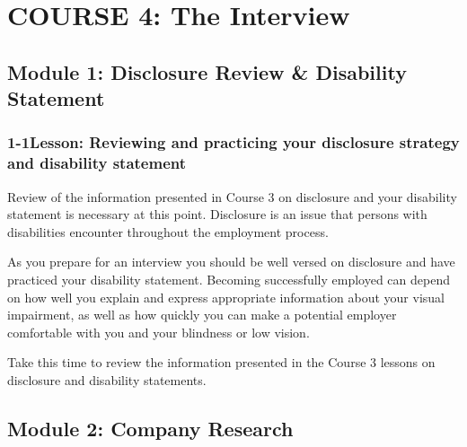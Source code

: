 \hypertarget{course4}{}\chapter*{COURSE 4: The Interview}\label{course4}
\noindent\makebox[\linewidth]{\rule{\linewidth}{0.4pt}}
\localtableofcontents 
\noindent\makebox[\textwidth]{\rule{\linewidth}{0.4pt}} 
\newpage

\pagebreak \section*{Module 1: Disclosure Review \& Disability Statement}
\noindent\makebox[\textwidth]{\rule{\linewidth}{0.4pt}} 
\localtableofcontents 
\noindent\makebox[\textwidth]{\rule{\linewidth}{0.4pt}} 

\pagebreak \subsection*{1-1\quad Lesson: Reviewing and practicing your disclosure strategy and disability statement}
Review of the information presented in Course 3 on disclosure and your disability statement is necessary at this point. Disclosure is an issue that persons with disabilities encounter throughout the employment process.

As you prepare for an interview you should be well versed on disclosure and have practiced your disability statement. Becoming successfully employed can depend on how well you explain and express appropriate information about your visual impairment, as well as how quickly you can make a potential employer comfortable with you and your blindness or low vision.

Take this time to review the information presented in the Course 3 lessons on disclosure and disability statements.
  
\pagebreak \section*{Module 2:	Company Research}
\noindent\makebox[\textwidth]{\rule{\linewidth}{0.4pt}}  \localtableofcontents 
\noindent\makebox[\textwidth]{\rule{\linewidth}{0.4pt}} 


